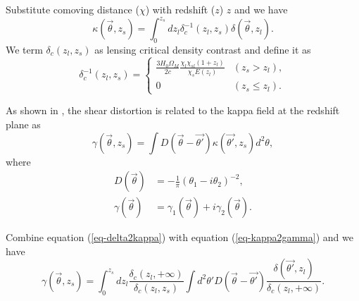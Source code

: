 \documentclass[twocolumn]{aastex62}
\newcommand{\vecb}[1]{{#1}}
\begin{document}
Substitute comoving distance ($\chi$) with redshift ($z$)
$z$ and we have
\begin{equation}\label{eq-delta2kappa}
\kappa(\vec{\theta},z_s)=\int_0^{z_s} dz_l \delta_{c}^{-1}(z_l,z_s)\delta(\vec{\theta},z_l).
\end{equation}
We term $\delta_{c}(z_l,z_s)$ as lensing critical density contrast and define it as
\begin{equation}
\delta_{c}^{-1}(z_l,z_s) =
\begin{cases}
\frac{3H_0\Omega_M}{2 c} \frac{\chi_l \chi_{sl} (1+z_l)}{\chi_{s} E\left(z_l\right)} & (z_s>z_l),\\
0&(z_s \leq z_l).
\end{cases}
\end{equation}

As shown in \citet{massMap-KS1993}, the shear distortion is related to the kappa field at the redshift plane as
\begin{equation}\label{eq-kappa2gamma}
\vecb{\gamma}(\vec{\theta},z_s) = \int \vecb{D}(\vec{\theta}-\vec{\theta'}) \kappa(\vec{\theta'},z_s) d^2 \theta,
\end{equation}
where
\begin{equation}
\begin{split}
\vecb{D}(\vec{\theta})&=-\frac{1}{\pi}(\theta_1-i\theta_2)^{-2},\\
\vecb{\gamma}(\vec{\theta})&=\gamma_1(\vec{\theta})+i\gamma_2(\vec{\theta}).
\end{split}
\end{equation}

Combine equation (\ref{eq-delta2kappa}) with equation (\ref{eq-kappa2gamma}) and we have
\begin{equation}\label{eq-delta2gamma-z}
\vecb{\gamma}(\vec{\theta},z_s) = \int_0^{z_s} dz_l \frac{\delta_c(z_l,+\infty)}{\delta_{c}(z_l,z_s)} \int d^2 \theta'  \vecb{D}(\vec{\theta}-\vec{\theta'}) \frac{\delta(\vec{\theta'},z_l)}{\delta_c(z_l,+\infty)}.
\end{equation}
\end{document}
